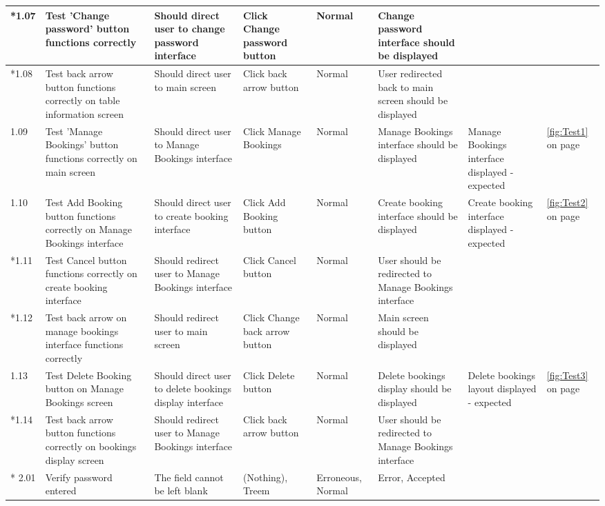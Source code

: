 \begin{landscape}
\begin{center}
\begin{longtable}{|p{1.5cm}|p{2.5cm}|p{2.5cm}|p{2cm}|p{2cm}|p{2cm}|p{2cm}|p{2cm}|}
        \rowcolor{gray} *1.07 & Test 'Change password' button functions correctly & Should direct user to change password interface  & Click Change password button & Normal & Change password interface should be displayed &  &  \\ \hline
         \rowcolor{gray}*1.08 & Test back arrow button functions correctly on table information screen & Should direct user to main screen & Click back arrow button & Normal & User redirected back to main screen should be displayed &  &  \\ \hline
        1.09 & Test 'Manage Bookings' button functions correctly on main screen & Should direct user to Manage Bookings interface  & Click Manage Bookings & Normal & Manage Bookings interface should be displayed & Manage Bookings interface displayed - expected  & \ref{fig:Test1} on page \pageref{fig:Test1} \\ \hline
        1.10 & Test Add Booking button functions correctly on Manage Bookings interface & Should direct user to create booking interface  & Click Add Booking button & Normal & Create booking interface should be displayed & Create booking interface displayed - expected & \ref{fig:Test2} on page \pageref{fig:Test2}  \\ \hline
        \rowcolor{gray} *1.11 & Test Cancel button functions correctly on create booking interface & Should redirect user to Manage Bookings interface  & Click Cancel button & Normal & User should be redirected to Manage Bookings interface &  &  \\ \hline
        \rowcolor{gray} *1.12 & Test back arrow on manage bookings interface functions correctly & Should redirect user to main screen  & Click Change back arrow button & Normal & Main screen should be displayed &  &  \\ \hline
        1.13 & Test Delete Booking button on Manage Bookings screen & Should direct user to delete bookings display interface  & Click Delete button & Normal & Delete bookings display should be displayed  &Delete bookings layout displayed - expected  & \ref{fig:Test3} on page \pageref{fig:Test3}  \\ \hline
        \rowcolor{gray} *1.14 & Test back arrow button functions correctly on bookings display screen & Should redirect user to Manage Bookings interface  & Click back arrow button & Normal & User should be redirected to Manage Bookings interface &  &  \\ \hline
       \rowcolor{gray} * 2.01 & Verify password entered & The field cannot be left blank  & (Nothing), Treem & Erroneous, Normal & Error, Accepted &  &  \\ \hline

\end{longtable}
\end{center}
\end{landscape}
